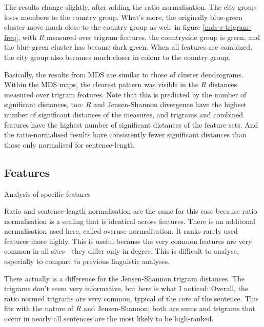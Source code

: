 The results change slightly, after adding the ratio normalisation. The
city group loses members to the country group. What's more, the
originally blue-green cluster move much close to the country group
as well--in figure \ref{mds-r-trigram-freq}, with
$R$ measured over trigram features, the countryside group is green,
and the blue-green cluster has become dark green. When all features
are combined, the city group also becomes much closer in colour to the
country group.

Basically, the results from MDS are similar to those of cluster
dendrograms. Within the MDS maps, the clearest pattern was visible in
the $R$ distances measured over trigram features. Note that this is
predicted by the number of significant distances, too: $R$ and
Jensen-Shannon divergence have the highest number of significant
distances of the measures, and trigrams and combined features have the
highest number of significant distances of the feature sets. And the
ratio-normalised results have consistently fewer significant distances
than those only normalised for sentence-length.

\subsection{Features}


Analysis of specific features

Ratio and sentence-length normalisation are the same for this case
because ratio normalisation is a scaling that is identical across
features. There is an additonal normalisation used here, called
overuse normalisation. It ranks rarely used features more highly.
This is useful because the very common features are very common in all
sites---they differ only in degree. This is difficult to analyse,
especially to compare to previous linguistic analyses.

There actually is a difference for the Jensen-Shannon trigram
distances. The trigrams don't seem very informative, but here is what
I noticed: Overall, the ratio normed trigrams are very common, typical
of the core of the sentence. This fits with the nature of $R$ and
Jensen-Shannon; both are sums and trigrams that occur in nearly all
sentences are the most likely to be high-ranked.

